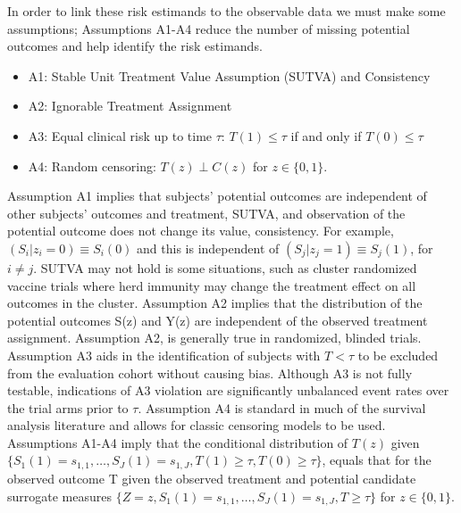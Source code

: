 \documentclass[times, doublespace]{simauth}
\begin{document}
In order to link these risk estimands to the observable data we must make some assumptions; Assumptions A1-A4 reduce the number of missing potential outcomes and help identify the risk estimands.
\begin{itemize}
\item A1: Stable Unit Treatment Value Assumption (SUTVA) and Consistency 
\item A2: Ignorable Treatment Assignment
\item A3: Equal clinical risk up to time $\tau$: $T(1) \leq\tau$ if and only if $T(0) \leq\tau$
\item A4: Random censoring: $T(z) \perp C(z)$ for $z\in \{0,1\}$.
\end{itemize} 
Assumption A1 implies that subjects' potential outcomes are independent of other subjects' outcomes and treatment, SUTVA, and observation of the potential outcome does not change its value, consistency. For example, $(S_i|z_i=0) \equiv S_i(0)$ and this is independent of $(S_j|z_j=1) \equiv S_j(1)$, for $i \neq j$. SUTVA may not hold is some situations, such as cluster randomized vaccine trials where herd immunity may change the treatment effect on all outcomes in the cluster.  Assumption A2 implies that the distribution of the potential outcomes S(z) and Y(z) are independent of the observed treatment assignment. Assumption A2, is generally true in randomized, blinded trials.  Assumption A3 aids in the identification of subjects with $T < \tau$ to be excluded from the evaluation cohort without causing bias. Although A3 is not fully testable, indications of A3 violation are significantly unbalanced event rates over the trial arms prior to $\tau$. Assumption A4 is standard in much of the survival analysis literature and allows for classic censoring models to be used. Assumptions A1-A4 imply that the conditional distribution of $T(z)$ given $\{S_{1}(1)=s_{1,1},\ldots,S_{J}(1)=s_{1,J}, T(1)\geq\tau, T(0)\geq\tau\}$, equals that for the observed outcome T given the observed treatment and potential candidate surrogate measures $\{Z=z, S_{1}(1)=s_{1,1},\ldots,S_{J}(1)=s_{1,J},T\geq\tau\}$ for $z\in \{0,1\}$.
\end{document}
